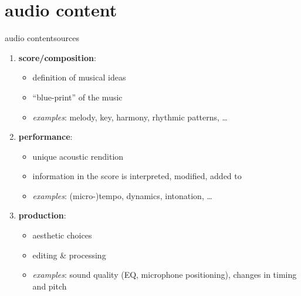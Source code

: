     \section[content]{audio content}
        \begin{frame}{audio content}{sources}

            \begin{enumerate}
                \item<2->	\textbf{score/composition}:
                    \begin{itemize}
                        \item   definition of musical ideas
                        \item   ``blue-print'' of the music
                        \item   \textit{examples}: melody, key, harmony, rhythmic patterns, \ldots
                    \end{itemize}
                \item<3->	\textbf{performance}:
                    \begin{itemize}
                        \item   unique acoustic rendition
                        \item   information in the score is interpreted, modified, added to
                        \item   \textit{examples}: (micro-)tempo, dynamics, intonation, \ldots
                    \end{itemize}
                \item<4->	\textbf{production}:
                    \begin{itemize}
                        \item   aesthetic choices 
                        \item   editing \& processing
                        \item   \textit{examples}: sound quality (EQ, microphone positioning), changes in timing and pitch
                    \end{itemize}
            \end{enumerate}
        \end{frame}
